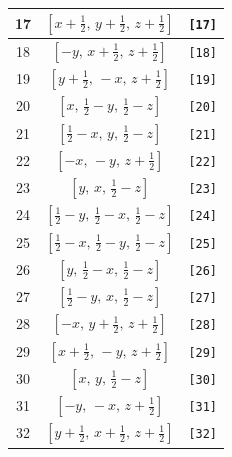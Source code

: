 \documentclass[fleqn,8pt]{jsarticle}
\begin{document}
\begin{longtable}{ccc}
17 & $\left[ x + \frac{1}{2},\, y + \frac{1}{2},\, z + \frac{1}{2} \right]$ & {\tt [17]} \\ \hline
18 & $\left[ - y,\, x + \frac{1}{2},\, z + \frac{1}{2} \right]$ & {\tt [18]} \\ \hline
19 & $\left[ y + \frac{1}{2},\, - x,\, z + \frac{1}{2} \right]$ & {\tt [19]} \\ \hline
20 & $\left[ x,\, \frac{1}{2} - y,\, \frac{1}{2} - z \right]$ & {\tt [20]} \\ \hline
21 & $\left[ \frac{1}{2} - x,\, y,\, \frac{1}{2} - z \right]$ & {\tt [21]} \\ \hline
22 & $\left[ - x,\, - y,\, z + \frac{1}{2} \right]$ & {\tt [22]} \\ \hline
23 & $\left[ y,\, x,\, \frac{1}{2} - z \right]$ & {\tt [23]} \\ \hline
24 & $\left[ \frac{1}{2} - y,\, \frac{1}{2} - x,\, \frac{1}{2} - z \right]$ & {\tt [24]} \\ \hline
25 & $\left[ \frac{1}{2} - x,\, \frac{1}{2} - y,\, \frac{1}{2} - z \right]$ & {\tt [25]} \\ \hline
26 & $\left[ y,\, \frac{1}{2} - x,\, \frac{1}{2} - z \right]$ & {\tt [26]} \\ \hline
27 & $\left[ \frac{1}{2} - y,\, x,\, \frac{1}{2} - z \right]$ & {\tt [27]} \\ \hline
28 & $\left[ - x,\, y + \frac{1}{2},\, z + \frac{1}{2} \right]$ & {\tt [28]} \\ \hline
29 & $\left[ x + \frac{1}{2},\, - y,\, z + \frac{1}{2} \right]$ & {\tt [29]} \\ \hline
30 & $\left[ x,\, y,\, \frac{1}{2} - z \right]$ & {\tt [30]} \\ \hline
31 & $\left[ - y,\, - x,\, z + \frac{1}{2} \right]$ & {\tt [31]} \\ \hline
32 & $\left[ y + \frac{1}{2},\, x + \frac{1}{2},\, z + \frac{1}{2} \right]$ & {\tt [32]} \\
\end{longtable}
\end{document}
